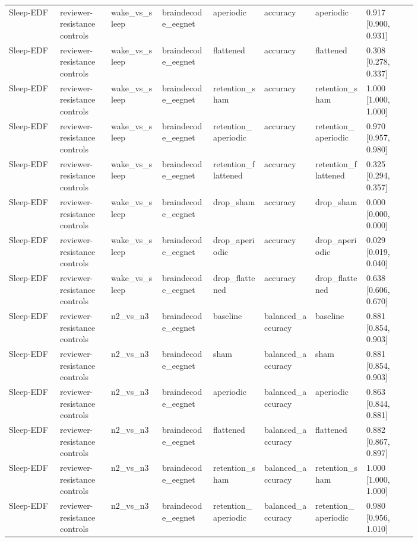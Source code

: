 \begin{longtable}{p{0.10\linewidth}p{0.10\linewidth}p{0.10\linewidth}p{0.10\linewidth}p{0.10\linewidth}p{0.10\linewidth}p{0.10\linewidth}p{0.10\linewidth}}
Sleep-EDF & reviewer-resistance controls & wake\_vs\_sleep & braindecode\_eegnet & aperiodic & accuracy & aperiodic & 0.917 [0.900, 0.931]\\
Sleep-EDF & reviewer-resistance controls & wake\_vs\_sleep & braindecode\_eegnet & flattened & accuracy & flattened & 0.308 [0.278, 0.337]\\
Sleep-EDF & reviewer-resistance controls & wake\_vs\_sleep & braindecode\_eegnet & retention\_sham & accuracy & retention\_sham & 1.000 [1.000, 1.000]\\
Sleep-EDF & reviewer-resistance controls & wake\_vs\_sleep & braindecode\_eegnet & retention\_aperiodic & accuracy & retention\_aperiodic & 0.970 [0.957, 0.980]\\
Sleep-EDF & reviewer-resistance controls & wake\_vs\_sleep & braindecode\_eegnet & retention\_flattened & accuracy & retention\_flattened & 0.325 [0.294, 0.357]\\
Sleep-EDF & reviewer-resistance controls & wake\_vs\_sleep & braindecode\_eegnet & drop\_sham & accuracy & drop\_sham & 0.000 [0.000, 0.000]\\
Sleep-EDF & reviewer-resistance controls & wake\_vs\_sleep & braindecode\_eegnet & drop\_aperiodic & accuracy & drop\_aperiodic & 0.029 [0.019, 0.040]\\
Sleep-EDF & reviewer-resistance controls & wake\_vs\_sleep & braindecode\_eegnet & drop\_flattened & accuracy & drop\_flattened & 0.638 [0.606, 0.670]\\
Sleep-EDF & reviewer-resistance controls & n2\_vs\_n3 & braindecode\_eegnet & baseline & balanced\_accuracy & baseline & 0.881 [0.854, 0.903]\\
Sleep-EDF & reviewer-resistance controls & n2\_vs\_n3 & braindecode\_eegnet & sham & balanced\_accuracy & sham & 0.881 [0.854, 0.903]\\
Sleep-EDF & reviewer-resistance controls & n2\_vs\_n3 & braindecode\_eegnet & aperiodic & balanced\_accuracy & aperiodic & 0.863 [0.844, 0.881]\\
Sleep-EDF & reviewer-resistance controls & n2\_vs\_n3 & braindecode\_eegnet & flattened & balanced\_accuracy & flattened & 0.882 [0.867, 0.897]\\
Sleep-EDF & reviewer-resistance controls & n2\_vs\_n3 & braindecode\_eegnet & retention\_sham & balanced\_accuracy & retention\_sham & 1.000 [1.000, 1.000]\\
Sleep-EDF & reviewer-resistance controls & n2\_vs\_n3 & braindecode\_eegnet & retention\_aperiodic & balanced\_accuracy & retention\_aperiodic & 0.980 [0.956, 1.010]\\

\end{longtable}
